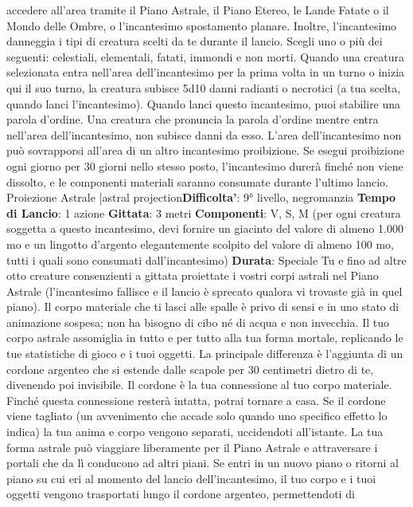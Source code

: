 \begin{multicols}{2}
accedere all’area tramite il Piano Astrale, il Piano
Etereo, le Lande Fatate o il Mondo delle Ombre, o
l’incantesimo spostamento planare.
Inoltre, l’incantesimo danneggia i tipi di creatura scelti
da te durante il lancio. Scegli uno o più dei seguenti:
celestiali, elementali, fatati, immondi e non morti.
Quando una creatura selezionata entra nell’area
dell’incantesimo per la prima volta in un turno o inizia
qui il suo turno, la creatura subisce 5d10 danni radianti
o necrotici (a tua scelta, quando lanci l’incantesimo).
Quando lanci questo incantesimo, puoi stabilire una
parola d’ordine. Una creatura che pronuncia la parola
d’ordine mentre entra nell’area dell’incantesimo, non
subisce danni da esso.
L’area dell’incantesimo non può sovrapporsi all’area di
un altro incantesimo proibizione. Se esegui proibizione
ogni giorno per 30 giorni nello stesso posto,
l’incantesimo durerà finché non viene dissolto, e le
componenti materiali saranno consumate durante
l’ultimo lancio.
Proiezione Astrale
[astral projection\textbf{Difficolta'}:
9° livello, negromanzia
\textbf{Tempo di Lancio}: 1 azione
\textbf{Gittata}: 3 metri
\textbf{Componenti}: V, S, M (per ogni creatura soggetta a
questo incantesimo, devi fornire un giacinto del valore
di almeno 1.000 mo e un lingotto d’argento
elegantemente scolpito del valore di almeno 100 mo,
tutti i quali sono consumati dall’incantesimo)
\textbf{Durata}: Speciale
Tu e fino ad altre otto creature consenzienti a gittata
proiettate i vostri corpi astrali nel Piano Astrale
(l’incantesimo fallisce e il lancio è sprecato qualora vi
trovaste già in quel piano). Il corpo materiale che ti lasci
alle spalle è privo di sensi e in uno stato di animazione
sospesa; non ha bisogno di cibo né di acqua e non
invecchia.
Il tuo corpo astrale assomiglia in tutto e per tutto alla tua
forma mortale, replicando le tue statistiche di gioco e i
tuoi oggetti. La principale differenza è l’aggiunta di un
cordone argenteo che si estende dalle scapole per 30
centimetri dietro di te, divenendo poi invisibile. Il
cordone è la tua connessione al tuo corpo materiale.
Finché questa connessione resterà intatta, potrai
tornare a casa. Se il cordone viene tagliato (un
avvenimento che accade solo quando uno specifico
effetto lo indica) la tua anima e corpo vengono separati,
uccidendoti all’istante.
La tua forma astrale può viaggiare liberamente per il
Piano Astrale e attraversare i portali che da lì
conducono ad altri piani. Se entri in un nuovo piano o
ritorni al piano su cui eri al momento del lancio
dell’incantesimo, il tuo corpo e i tuoi oggetti vengono
trasportati lungo il cordone argenteo, permettendoti di

\end{multicols}
